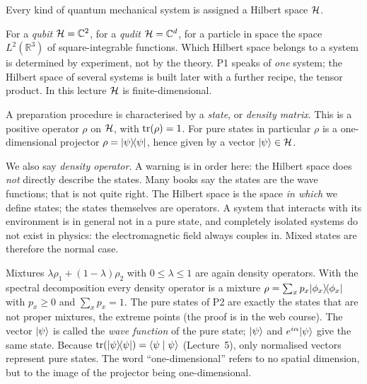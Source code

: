 \begin{merksatz}[P1]
	Every kind of quantum mechanical system is assigned a Hilbert space $\mathcal{H}$.
\end{merksatz}
For a \emph{qubit} $\mathcal{H} = \mathbb{C}^2$, for a \emph{qudit} $\mathcal{H} = \mathbb{C}^d$, for a particle in space the space $L^2(\mathbb{R}^3)$ of square-integrable functions. Which Hilbert space belongs to a system is determined by experiment, not by the theory. P1 speaks of \emph{one} system; the Hilbert space of several systems is built later with a further recipe, the tensor product. In this lecture $\mathcal{H}$ is finite-dimensional.

\begin{merksatz}[P2]
	A preparation procedure is characterised by a \emph{state}, or \emph{density matrix}. This is a positive operator $\rho$ on $\mathcal{H}$, with $\operatorname{tr}(\rho) = 1$. For pure states in particular $\rho$ is a one-dimensional projector $\rho = \lvert \psi \rangle\!\langle \psi \rvert$, hence given by a vector $\lvert \psi \rangle \in \mathcal{H}$.
\end{merksatz}
We also say \emph{density operator}. A warning is in order here: the Hilbert space does \emph{not} directly describe the states. Many books say the states are the wave functions; that is not quite right. The Hilbert space is the space \emph{in which} we define states; the states themselves are operators. A system that interacts with its environment is in general not in a pure state, and completely isolated systems do not exist in physics: the electromagnetic field always couples in. Mixed states are therefore the normal case.

Mixtures $\lambda\rho_1 + (1-\lambda)\rho_2$ with $0\leq\lambda\leq 1$ are again density operators. With the spectral decomposition every density operator is a mixture $\rho = \sum_x p_x\lvert \phi_x \rangle\!\langle \phi_x \rvert$ with $p_x\geq 0$ and $\sum_x p_x = 1$. The pure states of P2 are exactly the states that are not proper mixtures, the extreme points (the proof is in the web course). The vector $\lvert \psi \rangle$ is called the \emph{wave function} of the pure state; $\lvert \psi \rangle$ and $e^{i\alpha}\lvert \psi \rangle$ give the same state. Because $\operatorname{tr}(\lvert \psi \rangle\!\langle \psi \rvert) = \langle \psi \mid \psi \rangle$ (Lecture~5), only normalised vectors represent pure states. The word ``one-dimensional'' refers to no spatial dimension, but to the image of the projector being one-dimensional.


